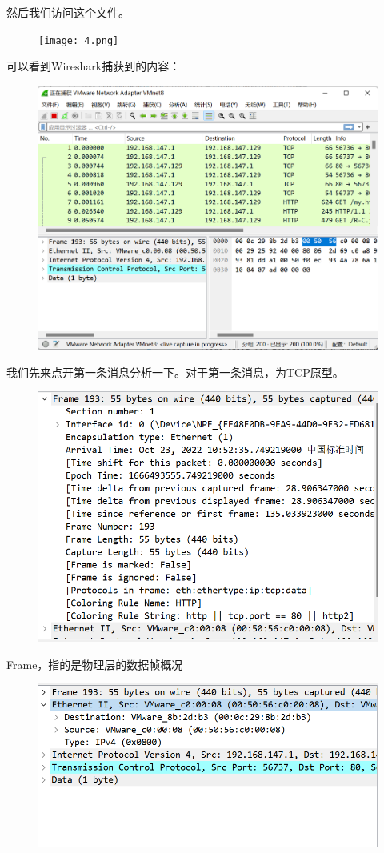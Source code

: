 \documentclass[UTF8,a4paper,10pt]{ctexart}
\begin{document}
然后我们访问这个文件。
\begin{figure}[H]
    \centering
    \texttt{[image: 4.png]}
    \label{fig:4}
\end{figure}
可以看到Wireshark捕获到的内容：
\begin{figure}[H]
    \centering
    \includegraphics[scale=0.6]{5.png}
    \label{fig:5}
\end{figure}
我们先来点开第一条消息分析一下。对于第一条消息，为TCP原型。
\begin{figure}[H]
    \centering
    \includegraphics[scale=0.6]{6.png}
    \label{fig:6}
\end{figure}
Frame，指的是物理层的数据帧概况
\begin{figure}[H]
    \centering
    \includegraphics[scale=0.6]{7.png}
    \label{fig:7}
\end{figure}
\end{document}
